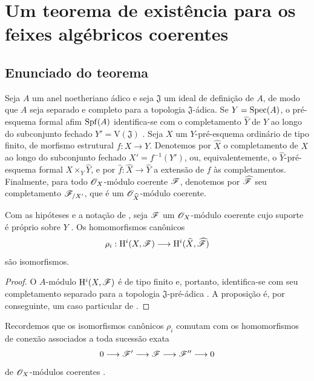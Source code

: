 \section{Um teorema de existência para os feixes algébricos coerentes}
\label{section:III.5}


\subsection{Enunciado do teorema}
\label{subsection:III.5.1}

\begin{env}[5.1.1]
\label{III.5.1.1}
Seja $A$ um anel noetheriano ádico e seja $\mathfrak{J}$ um ideal de
definição de $A$, de modo que $A$ seja separado e completo para a
topologia $\mathfrak{J}$-ádica. Se $Y=\operatorname{Spec}(A)$, o pré-esquema formal
afim $\operatorname{Spf}(A)$ identifica-se com o completamento
$\widehat{Y}$ de $Y$ ao longo do subconjunto fechado
$Y'=\mathrm{V}(\mathfrak{J})$ . Seja $X$ um
$Y$-pré-esquema ordinário de tipo finito, de morfismo estrutural
$f:X\to Y$. Denotemos por $\widehat{X}$ o completamento de $X$ ao longo
do subconjunto fechado $X'=f^{-1}(Y')$, ou, equivalentemente, o
$\widehat{Y}$-pré-esquema formal $X\times_Y\widehat{Y}$, e por
$\widehat{f}:\widehat{X}\to\widehat{Y}$ a extensão de $f$ às
completamentos. Finalmente, para todo $\mathscr{O}_X$-módulo coerente
$\mathscr{F}$, denotemos por $\widehat{\mathscr{F}}$ seu completamento
$\mathscr{F}_{/X'}$, que é um
$\mathscr{O}_{\widehat{X}}$-módulo coerente.
\end{env}

\begin{proposition}[5.1.2]
\label{III.5.1.2}
Com as hipóteses e a notação de , seja $\mathscr{F}$
um $\mathscr{O}_X$-módulo coerente cujo suporte é próprio sobre $Y$
. Os homomorfismos canônicos
\[
  \rho_i:
  \mathrm{H}^i(X,\mathscr{F})
  \longrightarrow
  \mathrm{H}^i(\widehat{X},\widehat{\mathscr{F}})
\]
são isomorfismos.
\end{proposition}

\begin{proof}
O $A$-módulo $\mathrm{H}^i(X,\mathscr{F})$ é de tipo finito
 e, portanto, identifica-se com seu completamento
separado para a topologia $\mathfrak{J}$-pré-ádica
. A proposição é, por conseguinte, um caso particular
de .
\end{proof}

Recordemos que os isomorfismos canônicos $\rho_i$ comutam com os
homomorfismos de conexão associados a toda sucessão exata
\[
  0\longrightarrow\mathscr{F}'
  \longrightarrow\mathscr{F}
  \longrightarrow\mathscr{F}''
  \longrightarrow0
\]
de $\mathscr{O}_X$-módulos coerentes
 .


